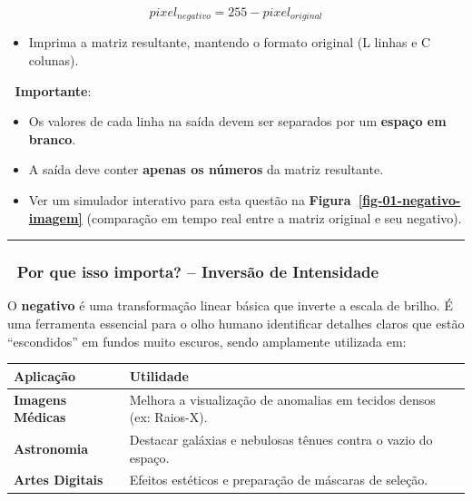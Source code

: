 \documentclass[
  portuguese,
  letterpaper,
  openany,
  oneside,
  12pt,
  a4paper]{book}
\providecommand{\tightlist}{%
  \setlength{\itemsep}{0pt}\setlength{\parskip}{0pt}}
\begin{document}
\[pixel_{negativo} = 255 - pixel_{original}\]

\begin{itemize}
\tightlist
\item
  Imprima a matriz resultante, mantendo o formato original (L linhas e C
  colunas).
\end{itemize}

📌 \textbf{Importante}:

\begin{itemize}
\tightlist
\item
  Os valores de cada linha na saída devem ser separados por um
  \textbf{espaço em branco}.
\item
  A saída deve conter \textbf{apenas os números} da matriz resultante.
\item
  Ver um simulador interativo para esta questão na
  \textbf{Figura~\ref{fig-01-negativo-imagem}} (comparação em tempo real
  entre a matriz original e seu negativo).
\end{itemize}

\begin{center}\rule{0.5\linewidth}{0.5pt}\end{center}

\subsubsection{🧠 Por que isso importa? -- Inversão de
Intensidade}\label{por-que-isso-importa-inversuxe3o-de-intensidade}

O \textbf{negativo} é uma transformação linear básica que inverte a
escala de brilho. É uma ferramenta essencial para o olho humano
identificar detalhes claros que estão ``escondidos'' em fundos muito
escuros, sendo amplamente utilizada em:

\begin{longtable}[]{@{}
  >{\raggedright\arraybackslash}p{}
  >{\raggedright\arraybackslash}p{}@{}}
\toprule\noalign{}
\begin{minipage}[b]{\linewidth}\raggedright
Aplicação
\end{minipage} & \begin{minipage}[b]{\linewidth}\raggedright
Utilidade
\end{minipage} \\
\midrule\noalign{}
\endhead
\bottomrule\noalign{}
\endlastfoot
\textbf{Imagens Médicas} & Melhora a visualização de anomalias em
tecidos densos (ex: Raios-X). \\
\textbf{Astronomia} & Destacar galáxias e nebulosas tênues contra o
vazio do espaço. \\
\textbf{Artes Digitais} & Efeitos estéticos e preparação de máscaras de
seleção. \\
\end{longtable}
\end{document}
